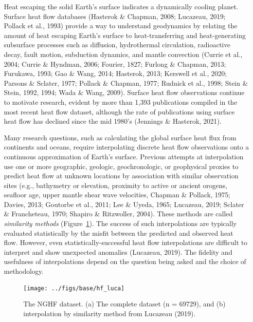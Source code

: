 \documentclass[draft,linenumbers]{agujournal2018}
\begin{document}
Heat escaping the solid Earth's surface indicates a dynamically cooling
planet. Surface heat flow databases (Hasterok \& Chapman, 2008;
Lucazeau, 2019; Pollack et al., 1993) provide a way to understand
geodynamics by relating the amount of heat escaping Earth's surface to
heat-transferring and heat-generating subsurface processes such as
diffusion, hydrothermal circulation, radioactive decay, fault motion,
subduction dynamics, and mantle convection (Currie et al., 2004; Currie
\& Hyndman, 2006; Fourier, 1827; Furlong \& Chapman, 2013; Furukawa,
1993; Gao \& Wang, 2014; Hasterok, 2013; Kerswell et al., 2020; Parsons
\& Sclater, 1977; Pollack \& Chapman, 1977; Rudnick et al., 1998; Stein
\& Stein, 1992, 1994; Wada \& Wang, 2009). Surface heat flow
observations continue to motivate research, evident by more than 1,393
publications compiled in the most recent heat flow dataset, although the
rate of publications using surface heat flow has declined since the mid
1980's (Jennings \& Hasterok, 2021).

Many research questions, such as calculating the global surface heat
flux from continents and oceans, require interpolating discrete heat
flow observations onto a continuous approximation of Earth's surface.
Previous attempts at interpolation use one or more geographic, geologic,
geochronologic, or geophysical proxies to predict heat flow at unknown
locations by association with similar observation sites (e.g.,
bathymetry or elevation, proximity to active or ancient orogens,
seafloor age, upper mantle shear wave velocities, Chapman \& Pollack,
1975; Davies, 2013; Goutorbe et al., 2011; Lee \& Uyeda, 1965; Lucazeau,
2019; Sclater \& Francheteau, 1970; Shapiro \& Ritzwoller, 2004). These
methods are called \emph{similarity methods} (Figure~\ref{fig:lucahf}).
The success of such interpolations are typically evaluated statistically
by the misfit between the predicted and observed heat flow. However,
even statistically-successful heat flow interpolations are difficult to
interpret and show unexpected anomalies (Lucazeau, 2019). The fidelity
and usefulness of interpolations depend on the question being asked and
the choice of methodology.

\begin{figure}[h]

{\centering \texttt{[image: ../figs/base/hf\_luca]} 

}

\caption{The NGHF dataset. (a) The complete dataset (n = 69729), and (b) interpolation by similarity method from Lucazeau (2019).}\label{fig:lucahf}
\end{figure}
\end{document}
